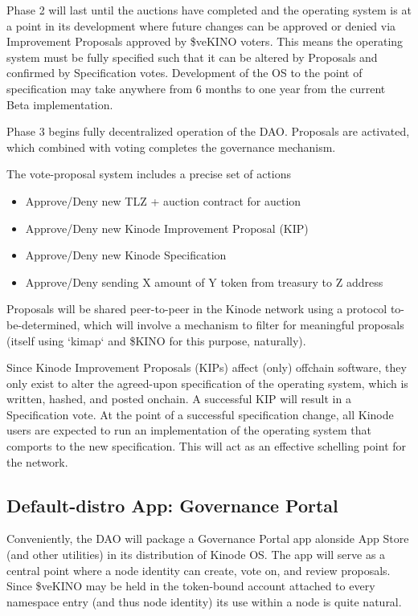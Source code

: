 \documentclass[runningheads]{llncs}
\begin{document}
Phase 2 will last until the auctions have completed and the operating system is at a point in its development where future changes can be approved or denied via Improvement Proposals approved by \$veKINO voters.
This means the operating system must be fully specified such that it can be altered by Proposals and confirmed by Specification votes.
Development of the OS to the point of specification may take anywhere from 6 months to one year from the current Beta implementation.

Phase 3 begins fully decentralized operation of the DAO.
Proposals are activated, which combined with voting completes the governance mechanism.

The vote-proposal system includes a precise set of actions
\begin{itemize}
    \item Approve/Deny new TLZ + auction contract for auction
    \item Approve/Deny new Kinode Improvement Proposal (KIP)
    \item Approve/Deny new Kinode Specification
    \item Approve/Deny sending X amount of Y token from treasury to Z address
\end{itemize}

Proposals will be shared peer-to-peer in the Kinode network using a protocol to-be-determined, which will involve a mechanism to filter for meaningful proposals (itself using `kimap` and \$KINO for this purpose, naturally).

Since Kinode Improvement Proposals (KIPs) affect (only) offchain software, they only exist to alter the agreed-upon specification of the operating system, which is written, hashed, and posted onchain.
A successful KIP will result in a Specification vote.
At the point of a successful specification change, all Kinode users are expected to run an implementation of the operating system that comports to the new specification.
This will act as an effective schelling point for the network.

\subsection{Default-distro App: Governance Portal}
\label{sec:daoportal}

Conveniently, the DAO will package a Governance Portal app alonside App Store (and other utilities) in its distribution of Kinode OS.
The app will serve as a central point where a node identity can create, vote on, and review proposals.
Since \$veKINO may be held in the token-bound account attached to every namespace entry (and thus node identity) its use within a node is quite natural.
\end{document}
